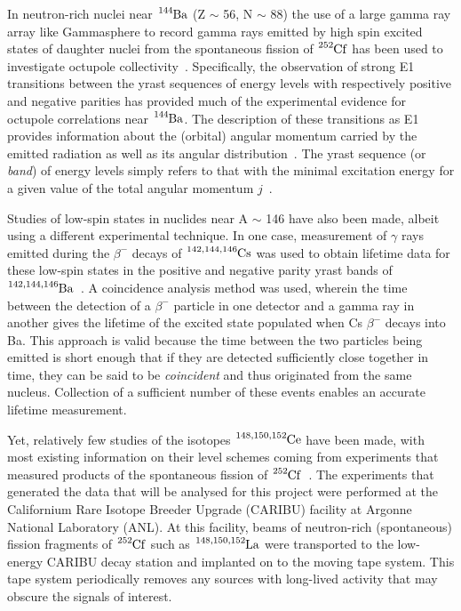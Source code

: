 \documentclass[12pt,a4paper]{article}
\begin{document}
\medskip
\noindent
In neutron-rich nuclei near $\ce{^{144}Ba}$ (Z $\sim$ 56, N $\sim$ 88) the use of a large gamma ray array like Gammasphere to record gamma rays emitted by high spin excited states of daughter nuclei from the spontaneous fission of $\ce{^{252}Cf}$ has been used to investigate octupole collectivity~\cite{phillips_octupole_1988,chen_search_2006}.
Specifically, the observation of strong E1 transitions between the yrast sequences of energy levels with respectively positive and negative parities has provided much of the experimental evidence for octupole correlations near $\ce{^{144}Ba}$.
The description of these transitions as E1 provides information about the (orbital) angular momentum carried by the emitted radiation as well as its angular distribution~\cite{casten_nuclear_1990}.
The yrast sequence (or \textit{band}) of energy levels simply refers to that with the minimal excitation energy for a given value of the total angular momentum $j$~\cite{casten_nuclear_1990}.

\medskip
\noindent
Studies of low-spin states in nuclides near A $\sim$ 146 have also been made, albeit using a different experimental technique.
In one case, measurement of $\gamma$ rays emitted during the $\beta^-$ decays of $\ce{^{142,144,146}Cs}$ was used to obtain lifetime data for these low-spin states in the positive and negative parity yrast bands of $\ce{^{142,144,146}Ba}$~\cite{mach_influence_1990}.
A coincidence analysis method was used, wherein the time between the detection of a $\beta^-$ particle in one detector and a gamma ray in another gives the lifetime of the excited state populated when Cs $\beta^-$ decays into Ba.
This approach is valid because the time between the two particles being emitted is short enough that if they are detected sufficiently close together in time, they can be said to be \textit{coincident} and thus originated from the same nucleus.
Collection of a sufficient number of these events enables an accurate lifetime measurement.

\medskip
\noindent
Yet, relatively few studies of the isotopes $\ce{^{148,150,152}Ce}$ have been made, with most existing information on their level schemes coming from experiments that measured products of the spontaneous fission of $\ce{^{252}Cf}$~\cite{nica_notitle_117,
martin_notitle_114,
bazu_notitle_114}.
The experiments that generated the data that will be analysed for this project were performed at the Californium Rare Isotope Breeder Upgrade (CARIBU) facility at Argonne National Laboratory (ANL).
At this facility, beams of neutron-rich (spontaneous) fission fragments of $\ce{^{252}Cf}$ such as $\ce{^{148,150,152}La}$ were transported to the low-energy CARIBU decay station and implanted on to the moving tape system.
This tape system periodically removes any sources with long-lived activity that may obscure the signals of interest.
\end{document}
